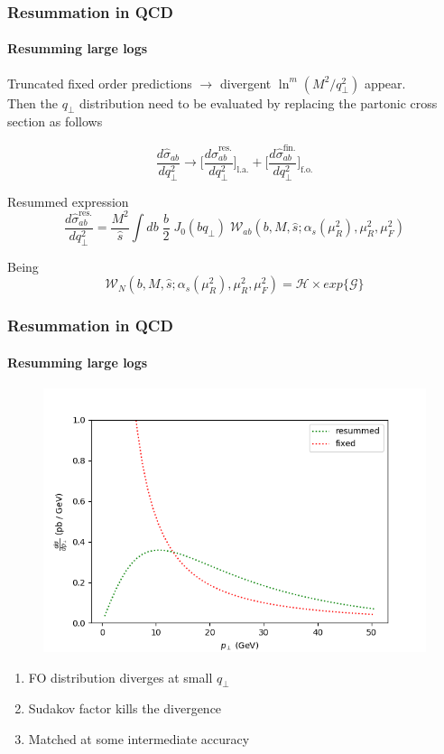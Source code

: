 \documentclass[aspectratio=43]{beamer}
\begin{document}
\begin{frame}

	\frametitle{Resummation in QCD}
	\framesubtitle{Resumming large logs}

	Truncated fixed order predictions $\rightarrow$ divergent $\ln^{m}(M^{2}/q_{\perp}^{2})$ appear.\\
	Then the $q_{\perp}$ distribution need to be evaluated by replacing the partonic cross section as follows
	
	\begin{equation}
		\frac{d\hat{\sigma}_{ab}}{dq_{\perp}^{2}} \rightarrow 
		\Bigg[ \frac{d\hat{\sigma}^{\textrm{res.}}_{ab}}{dq_{\perp}^{2}} \Bigg]_{\textrm{l.a.}} + 
		\Bigg[ \frac{d\hat{\sigma}^{\textrm{fin.}}_{ab}}{dq_{\perp}^{2}} \Bigg]_{\textrm{f.o.}} \nonumber
	\end{equation}

	Resummed expression 
	\begin{equation}
		\frac{d\hat{\sigma}_{ab}^{\textrm{res.}}}{dq_{\perp}^{2}} = \frac{M^{2}}{\hat{s}} \int db \; \frac{b}{2} \; J_{0}(b q_{\perp}) \; \mathcal{W}_{ab}(b, M, \hat{s}; \alpha_{s}(\mu_{R}^{2}), \mu_{R}^{2}, \mu_{F}^{2}) \nonumber
	\end{equation}
	
	Being
	\begin{equation}
		\mathcal{W}_{N}(b, M, \hat{s}; \alpha_{s}(\mu_{R}^{2}), \mu_{R}^{2}, \mu_{F}^{2}) = \mathcal{H} \times exp\{\mathcal{G}\} \nonumber
	\end{equation}

\end{frame}

\begin{frame}

	\frametitle{Resummation in QCD}
	\framesubtitle{Resumming large logs}
		
		\begin{figure}[!htb]
			\includegraphics[width = 6 cm]{plots/hqt_resummed.png}
		\end{figure}
		
		\begin{enumerate}
			\item FO distribution diverges at small $q_{\perp}$
			\item Sudakov factor kills the divergence
			\item Matched at some intermediate accuracy
		\end{enumerate}

\end{frame}
\end{document}
